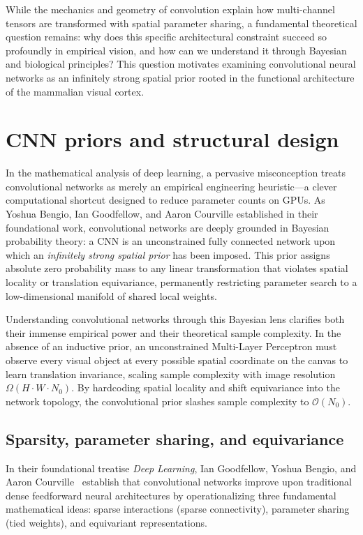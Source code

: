 While the mechanics and geometry of convolution explain how multi-channel tensors are transformed with spatial parameter sharing, a fundamental theoretical question remains: why does this specific architectural constraint succeed so profoundly in empirical vision, and how can we understand it through Bayesian and biological principles? This question motivates examining convolutional neural networks as an infinitely strong spatial prior rooted in the functional architecture of the mammalian visual cortex.

\section{CNN priors and structural design}
\label{sec:cnns_as_infinitely_strong_prior}

In the mathematical analysis of deep learning, a pervasive misconception treats convolutional networks as merely an empirical engineering heuristic---a clever computational shortcut designed to reduce parameter counts on GPUs. As Yoshua Bengio, Ian Goodfellow, and Aaron Courville established in their foundational work, convolutional networks are deeply grounded in Bayesian probability theory: a CNN is an unconstrained fully connected network upon which an \emph{infinitely strong spatial prior} has been imposed. This prior assigns absolute zero probability mass to any linear transformation that violates spatial locality or translation equivariance, permanently restricting parameter search to a low-dimensional manifold of shared local weights.

Understanding convolutional networks through this Bayesian lens clarifies both their immense empirical power and their theoretical sample complexity. In the absence of an inductive prior, an unconstrained Multi-Layer Perceptron must observe every visual object at every possible spatial coordinate on the canvas to learn translation invariance, scaling sample complexity with image resolution $\Omega(H \cdot W \cdot N_0)$. By hardcoding spatial locality and shift equivariance into the network topology, the convolutional prior slashes sample complexity to $\mathcal{O}(N_0)$.

\subsection{Sparsity, parameter sharing, and equivariance}
\label{sec:translation_equivariance_sample_complexity}

In their foundational treatise \textit{Deep Learning}, Ian Goodfellow, Yoshua Bengio, and Aaron Courville~\cite{goodfellow2016deep} establish that convolutional networks improve upon traditional dense feedforward neural architectures by operationalizing three fundamental mathematical ideas: sparse interactions (sparse connectivity), parameter sharing (tied weights), and equivariant representations.

